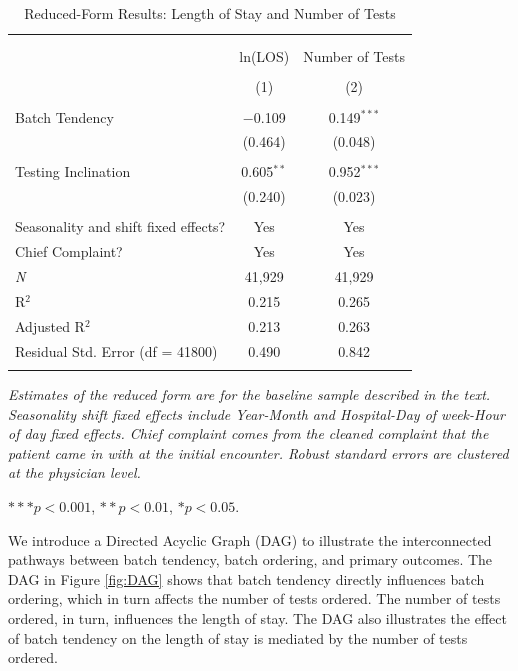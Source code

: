 \documentclass[,,nonblindrev]{informs}
\begin{document}
\begin{table}[!htbp] \centering 
\caption{Reduced-Form Results: Length of Stay and Number of Tests}
  \label{} 
\begin{tabular}{@{\extracolsep{5pt}}lcc} 
\\[-1.8ex]\hline 
\hline \\[-1.8ex] 
\\[-1.8ex] & ln(LOS) & Number of Tests \\ 
\\[-1.8ex] & (1) & (2)\\ 
\hline \\[-1.8ex] 
 Batch Tendency & $-$0.109 & 0.149$^{***}$ \\ 
  & (0.464) & (0.048) \\ 
  & & \\ 
 Testing Inclination & 0.605$^{**}$ & 0.952$^{***}$ \\ 
  & (0.240) & (0.023) \\ 
  & & \\ 
Seasonality and shift fixed effects? & Yes & Yes \\
Chief Complaint? & Yes & Yes  \\
\hline 
\textit{N} & 41,929 & 41,929 \\ 
R$^{2}$ & 0.215 & 0.265 \\ 
Adjusted R$^{2}$ & 0.213 & 0.263 \\ 
Residual Std. Error (df = 41800) & 0.490 & 0.842 \\ 
\hline 
\hline \\[-1.8ex] 
\end{tabular} 
\begin{tablenotes}
\small
\item \textit{Estimates of the reduced form are for the baseline sample described in the text. Seasonality shift fixed effects include Year-Month and Hospital-Day of week-Hour of day fixed effects. Chief complaint comes from the cleaned complaint that the patient came in with at the initial encounter. Robust standard errors are clustered at the physician level.}
\item $*** p < 0.001$, $** p < 0.01$, $* p < 0.05$.
\end{tablenotes}
\end{table}

We introduce a Directed Acyclic Graph (DAG) to illustrate the
interconnected pathways between batch tendency, batch ordering, and
primary outcomes. The DAG in Figure \ref{fig:DAG} shows that batch
tendency directly influences batch ordering, which in turn affects the
number of tests ordered. The number of tests ordered, in turn,
influences the length of stay. The DAG also illustrates the effect of
batch tendency on the length of stay is mediated by the number of tests
ordered.
\end{document}
